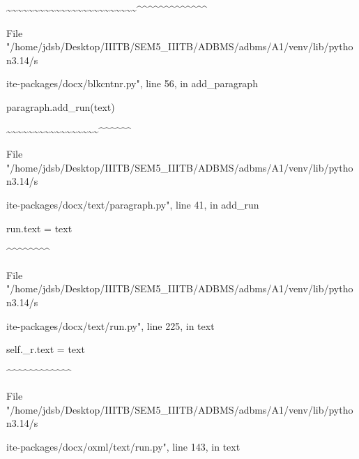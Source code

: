 \documentclass[11pt,a4paper]{article}
\begin{document}
{\textasciitilde{}\textasciitilde{}\textasciitilde{}\textasciitilde{}\textasciitilde{}\textasciitilde{}\textasciitilde{}\textasciitilde{}\textasciitilde{}\textasciitilde{}\textasciitilde{}\textasciitilde{}\textasciitilde{}\textasciitilde{}\textasciitilde{}\textasciitilde{}\textasciitilde{}\textasciitilde{}\textasciitilde{}\textasciitilde{}\textasciitilde{}\textasciitilde{}\textasciitilde{}\textasciitilde{}\textasciicircum{}\textasciicircum{}\textasciicircum{}\textasciicircum{}\textasciicircum{}\textasciicircum{}\textasciicircum{}\textasciicircum{}\textasciicircum{}\textasciicircum{}\textasciicircum{}\textasciicircum{}\textasciicircum{}

File "/home/jdsb/Desktop/IIITB/SEM5\_IIITB/ADBMS/adbms/A1/venv/lib/python3.14/s

ite-packages/docx/blkcntnr.py", line 56, in add\_paragraph

paragraph.add\_run(text)

\textasciitilde{}\textasciitilde{}\textasciitilde{}\textasciitilde{}\textasciitilde{}\textasciitilde{}\textasciitilde{}\textasciitilde{}\textasciitilde{}\textasciitilde{}\textasciitilde{}\textasciitilde{}\textasciitilde{}\textasciitilde{}\textasciitilde{}\textasciitilde{}\textasciitilde{}\textasciicircum{}\textasciicircum{}\textasciicircum{}\textasciicircum{}\textasciicircum{}\textasciicircum{}

File "/home/jdsb/Desktop/IIITB/SEM5\_IIITB/ADBMS/adbms/A1/venv/lib/python3.14/s

ite-packages/docx/text/paragraph.py", line 41, in add\_run

run.text = text

\textasciicircum{}\textasciicircum{}\textasciicircum{}\textasciicircum{}\textasciicircum{}\textasciicircum{}\textasciicircum{}\textasciicircum{}

File "/home/jdsb/Desktop/IIITB/SEM5\_IIITB/ADBMS/adbms/A1/venv/lib/python3.14/s

ite-packages/docx/text/run.py", line 225, in text

self.\_r.text = text

\textasciicircum{}\textasciicircum{}\textasciicircum{}\textasciicircum{}\textasciicircum{}\textasciicircum{}\textasciicircum{}\textasciicircum{}\textasciicircum{}\textasciicircum{}\textasciicircum{}\textasciicircum{}

File "/home/jdsb/Desktop/IIITB/SEM5\_IIITB/ADBMS/adbms/A1/venv/lib/python3.14/s

ite-packages/docx/oxml/text/run.py", line 143, in text

}
\end{document}

